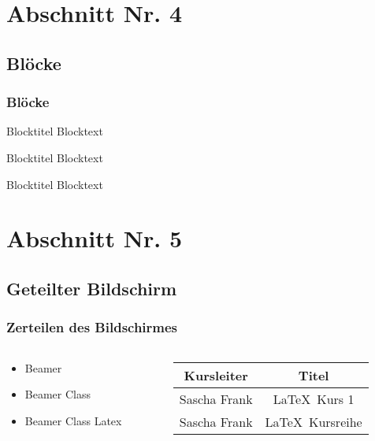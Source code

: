 \documentclass{beamer}
\begin{document}
\section{Abschnitt Nr. 4}
\subsection{Bl\"ocke}
\begin{frame}\frametitle{Bl\"ocke}

\begin{block}{Blocktitel}
Blocktext 
\end{block}

\begin{exampleblock}{Blocktitel}
Blocktext 
\end{exampleblock}


\begin{alertblock}{Blocktitel}
Blocktext 
\end{alertblock}
\end{frame}

\section{Abschnitt Nr. 5}
\subsection{Geteilter Bildschirm}

\begin{frame}\frametitle{Zerteilen des Bildschirmes}
\begin{columns}
\begin{column}{5cm}
\begin{itemize}
\item Beamer 
\item Beamer Class 
\item Beamer Class Latex 
\end{itemize}
\end{column}
\begin{column}{5cm}
\begin{tabular}{|c|c|}
\hline
\textbf{Kursleiter} & \textbf{Titel} \\
\hline
Sascha Frank &  \LaTeX \ Kurs 1 \\
\hline
Sascha Frank & \LaTeX \ Kursreihe \\
\hline
\end{tabular}
\end{column}
\end{columns}
\end{frame}
\end{document}
